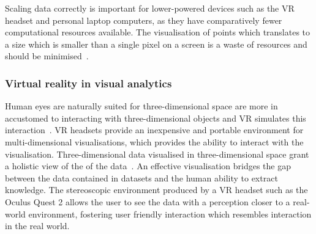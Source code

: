 Scaling data correctly is important for lower-powered devices such as the VR headset and personal laptop computers, as they have comparatively fewer computational resources available.
The visualisation of points which translates to a size which is smaller than a single pixel on a screen is a waste of resources and should be minimised~\cite{Li2016, ertl1999}.


\subsubsection{Virtual reality in visual analytics}
Human eyes are naturally suited for three-dimensional space are more in accustomed to interacting with three-dimensional objects and VR simulates this interaction~\cite{Ferrand2018, Abidi2017}.
VR headsets provide an inexpensive and portable environment for multi-dimensional visualisations, which provides the ability to interact with the visualisation.
Three-dimensional data visualised in three-dimensional space grant a holistic view of the of the data~\cite{Ferrand2016, Farr2009}.
An effective visualisation bridges the gap between the data contained in datasets and the human ability to extract knowledge.
The stereoscopic environment produced by a VR headset such as the Oculus Quest 2 allows the user to see the data with a perception closer to a real-world environment, fostering user friendly interaction which resembles interaction in the real world.


